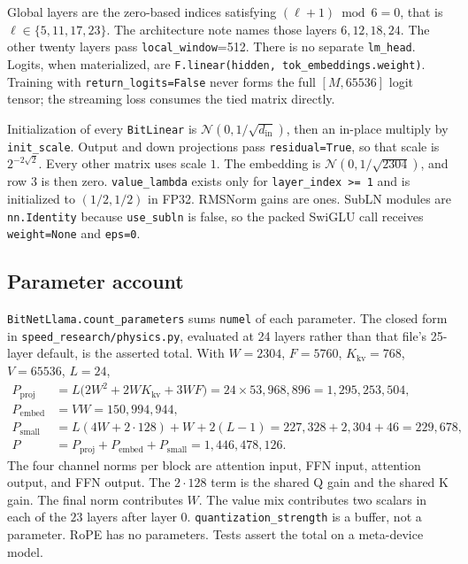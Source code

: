 \documentclass[11pt]{article}
\DeclareRobustCommand{\code}[1]{\texttt{#1}}
\begin{document}
Global layers are the zero-based indices satisfying
\((\ell+1)\bmod 6=0\), that is \(\ell\in\{5,11,17,23\}\). The architecture
note names those layers \(6,12,18,24\). The other twenty layers pass
\code{local\_window}=512. There is no separate \code{lm\_head}. Logits, when
materialized, are \code{F.linear(hidden, tok\_embeddings.weight)}. Training
with \code{return\_logits=False} never forms the full
\([M,65536]\) logit tensor; the streaming loss consumes the tied matrix
directly.

Initialization of every \code{BitLinear} is
\(\mathcal{N}(0,1/\sqrt{d_{\mathrm{in}}})\), then an in-place multiply by
\code{init\_scale}. Output and down projections pass \code{residual=True}, so
that scale is \(2^{-2\sqrt{2}}\). Every other matrix uses scale \(1\). The
embedding is \(\mathcal{N}(0,1/\sqrt{2304})\), and row \(3\) is then zero.
\code{value\_lambda} exists only for \code{layer\_index >= 1} and is
initialized to \((1/2,1/2)\) in FP32. RMSNorm gains are ones. SubLN modules
are \code{nn.Identity} because \code{use\_subln} is false, so the packed
SwiGLU call receives \code{weight=None} and \code{eps=0}.

\subsection{Parameter account}

\code{BitNetLlama.count\_parameters} sums \code{numel} of each parameter. The closed
form in \code{speed\_research/physics.py}, evaluated at 24 layers rather than
that file's 25-layer default, is the asserted total. With
\(W=2304\), \(F=5760\), \(K_{\mathrm{kv}}=768\), \(V=65536\), \(L=24\),
\begin{align*}
P_{\mathrm{proj}}
 &= L\bigl(2W^{2}+2W K_{\mathrm{kv}}+3WF\bigr)
  = 24\times 53{,}968{,}896
  = 1{,}295{,}253{,}504,\\
P_{\mathrm{embed}}
 &= VW = 150{,}994{,}944,\\
P_{\mathrm{small}}
 &= L(4W+2\cdot 128)+W+2(L-1)
  = 227{,}328+2{,}304+46
  = 229{,}678,\\
P
 &= P_{\mathrm{proj}}+P_{\mathrm{embed}}+P_{\mathrm{small}}
  = 1{,}446{,}478{,}126.
\end{align*}
The four channel norms per block are attention input, FFN input, attention
output, and FFN output. The \(2\cdot 128\) term is the shared Q gain and the
shared K gain. The final norm contributes \(W\). The value mix contributes
two scalars in each of the \(23\) layers after layer \(0\).
\code{quantization\_strength} is a buffer, not a parameter. RoPE has no
parameters. Tests assert the total on a meta-device model.
\end{document}
